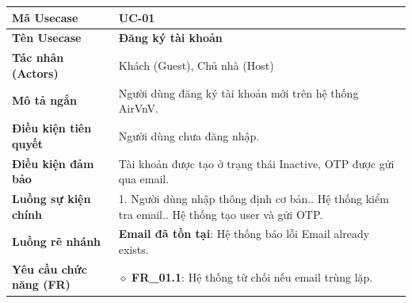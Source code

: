 
\begin{table}[H]
\renewcommand{\arraystretch}{1.3}
\centering
\begin{tabularx}{\textwidth}{|p{4.5cm}|X|}
\hline
\cellcolor{gray!15}\bfseries Mã Usecase & \textbf{UC-01} \\ \hline
\cellcolor{gray!15}\bfseries Tên Usecase & \textbf{Đăng ký tài khoản} \\ \hline
\cellcolor{gray!15}\bfseries Tác nhân (Actors) & Khách (Guest), Chủ nhà (Host) \\ \hline
\cellcolor{gray!15}\bfseries Mô tả ngắn & Người dùng đăng ký tài khoản mới trên hệ thống AirVnV. \\ \hline
\cellcolor{gray!15}\bfseries Điều kiện tiên quyết & Người dùng chưa đăng nhập. \\ \hline
\cellcolor{gray!15}\bfseries Điều kiện đảm bảo & Tài khoản được tạo ở trạng thái Inactive, OTP được gửi qua email. \\ \hline
\cellcolor{gray!15}\bfseries Luồng sự kiện chính & 1. Người dùng nhập thông định cơ bản.\newline 2. Hệ thống kiểm tra email.\newline 3. Hệ thống tạo user và gửi OTP. \\ \hline
\cellcolor{gray!15}\bfseries Luồng rẽ nhánh & \textbf{Email đã tồn tại}: Hệ thống báo lỗi Email already exists. \\ \hline
\cellcolor{gray!15}\bfseries Yêu cầu chức năng (FR) & $\diamond$ \textbf{FR\_01.1}: Hệ thống từ chối nếu email trùng lặp. \\ \hline
\end{tabularx}
\end{table}

